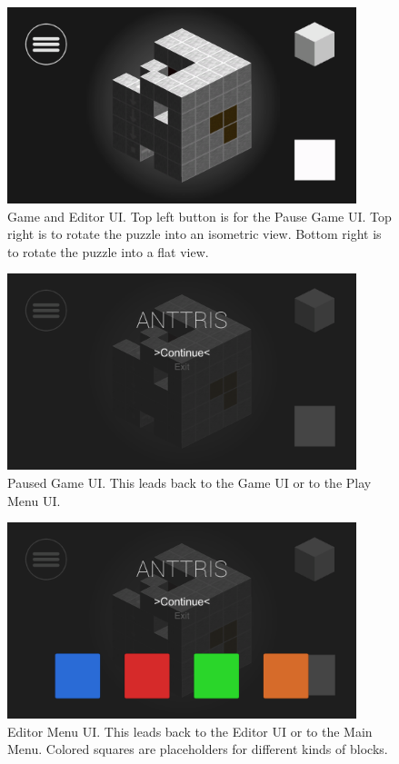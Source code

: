 \documentclass[12pt]{article}
\begin{document}
	\begin{figure}[H]
        \centering
        \includegraphics[width=4in]{GameUI.png}
        \caption{Game and Editor UI. Top left button is for the Pause Game UI. Top right is to rotate the puzzle into an isometric view. Bottom right is to rotate the puzzle into a flat view.}
    \end{figure}
    \begin{figure}[H]
        \centering
        \includegraphics[width=4in]{GamePauseUI.png}
        \caption{Paused Game UI. This leads back to the Game UI or to the Play Menu UI. }
    \end{figure}
    \begin{figure}[H]
        \centering
        \includegraphics[width=4in]{EditorMenuUI.png}
        \caption{Editor Menu UI. This leads back to the Editor UI or to the Main Menu. Colored squares are placeholders for different kinds of blocks. }
    \end{figure}
\end{document}
